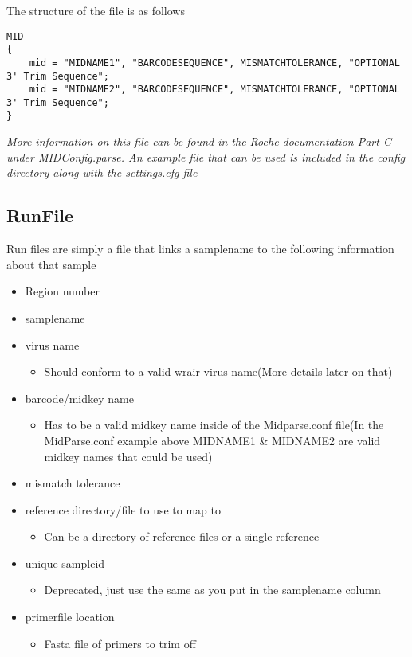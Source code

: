 \documentclass{article}
\begin{document}
The structure of the file is as follows
\begin{lstlisting}
MID
{
    mid = "MIDNAME1", "BARCODESEQUENCE", MISMATCHTOLERANCE, "OPTIONAL 3' Trim Sequence";
    mid = "MIDNAME2", "BARCODESEQUENCE", MISMATCHTOLERANCE, "OPTIONAL 3' Trim Sequence";
}
\end{lstlisting}

{\em More information on this file can be found in the Roche documentation Part C under MIDConfig.parse. An example file that can be used is included in the config directory along with the settings.cfg file}

\subsection{RunFile}
\label{sec:RunFile}

Run files are simply a file that links a samplename to the following information about that sample
\begin{itemize}
 \item Region number
 \item samplename
 \item virus name
  \begin{itemize}
   \item Should conform to a valid wrair virus name(More details later on that)
  \end{itemize}
 \item barcode/midkey name
  \begin{itemize}
   \item Has to be a valid midkey name inside of the Midparse.conf file(In the MidParse.conf example above MIDNAME1 \& MIDNAME2 are valid midkey names that could be used)
  \end{itemize}
 \item mismatch tolerance
 \item reference directory/file to use to map to
  \begin{itemize}
   \item Can be a directory of reference files or a single reference
  \end{itemize}
 \item unique sampleid
  \begin{itemize}
   \item Deprecated, just use the same as you put in the samplename column
  \end{itemize}
 \item primerfile location
  \begin{itemize}
   \item Fasta file of primers to trim off
  \end{itemize}
\end{itemize}
\end{document}
